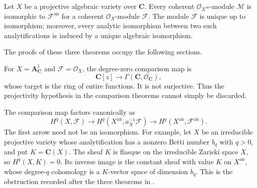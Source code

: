 \begin{theorem}
\label{theorem-gaga-essential-surjectivity}
\begin{reference}
\cite[\S 3, no. 12, Theorem 3]{GAGA}
\end{reference}
Let $X$ be a projective algebraic variety over $\mathbf C$. Every coherent
$\mathcal O_{X^{\mathrm{an}}}$-module $\mathcal M$ is isomorphic to
$\mathcal F^{\mathrm{an}}$ for a coherent $\mathcal O_X$-module
$\mathcal F$. The module $\mathcal F$ is unique up to isomorphism; moreover,
every analytic isomorphism between two such analytifications is induced by
a unique algebraic isomorphism.
\end{theorem}

The proofs of these three theorems occupy the following sections.

\begin{remark}
\label{remark-gaga-projectivity-essential}
For $X=\mathbf A^1_{\mathbf C}$ and $\mathcal F=\mathcal O_X$, the
degree-zero comparison map is
$$
\mathbf C[z]\longrightarrow
\Gamma(\mathbf C,\mathcal O_{\mathbf C}),
$$
whose target is the ring of entire functions. It is not surjective. Thus the
projectivity hypothesis in the comparison theorems cannot simply be
discarded.
\end{remark}

\begin{remark}
\label{remark-gaga-comparison-factorization}
The comparison map factors canonically as
$$
H^q(X,\mathcal F)
\longrightarrow H^q(X^{\mathrm{an}},a_X^{-1}\mathcal F)
\longrightarrow H^q(X^{\mathrm{an}},\mathcal F^{\mathrm{an}}).
$$
The first arrow need not be an isomorphism. For example, let $X$ be an
irreducible projective variety whose analytification has a nonzero Betti
number $b_q$ with $q>0$, and put $K=\mathbf C(X)$. The sheaf $K$ is flasque
on the irreducible Zariski space $X$, so $H^q(X,K)=0$. Its inverse image is
the constant sheaf with value $K$ on $X^{\mathrm{an}}$, whose degree-$q$
cohomology is a $K$-vector space of dimension $b_q$. This is the obstruction
recorded after the three theorems in \cite[\S 3, no. 12]{GAGA}.
\end{remark}


